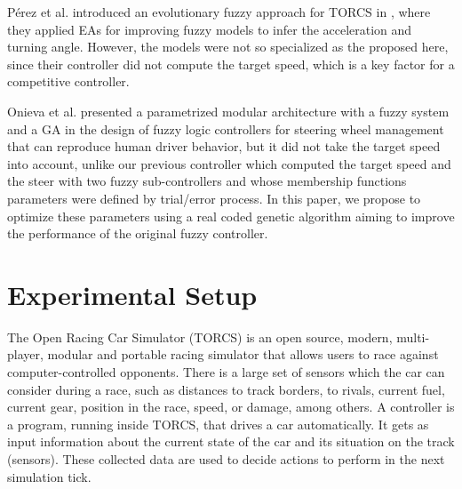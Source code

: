 \documentclass[conference]{IEEEtran}
\begin{document}
Pérez et al. introduced an evolutionary fuzzy approach for TORCS in \cite{PerezEvolvingFuzzy09}, where they applied EAs for improving fuzzy models to infer the acceleration and turning angle. However, the models were not so specialized as the proposed here, since their controller did not compute the target speed, which is a key factor for a competitive controller. 

Onieva et al. \cite{LFAG} presented a parametrized modular architecture with a fuzzy system and a GA in the design of fuzzy logic controllers for steering wheel management that can reproduce human driver behavior, but it did not take the target speed into account, unlike our previous controller \cite{evo17} which computed the target speed and the steer with two fuzzy sub-controllers and whose membership functions parameters were defined by trial/error process.
In this paper, we propose to optimize these parameters using a real coded genetic algorithm aiming to improve the performance of the original fuzzy controller. %


\section{Experimental Setup}
\label{sec:torcs}

The Open Racing Car Simulator (TORCS) \cite{WebTORCS} is an open source, modern, multi-player, modular and portable racing simulator that allows users to race against computer-controlled opponents.
There is a large set of sensors \cite{Torcs3} which the car can consider during a race, such as distances to track borders, to rivals, current fuel, current gear, position in the race, speed, or damage, among others.
A controller is a program, running inside TORCS, that 
drives a car automatically. It gets as input information about the current state of
the car and its situation on the track (sensors). These collected data
are used to decide actions to perform in the next simulation tick.  
\end{document}
